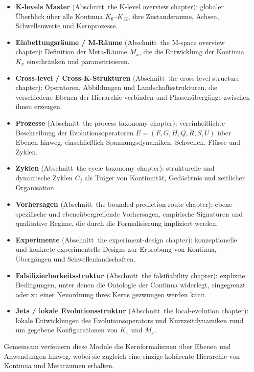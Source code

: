 \begin{itemize}
\item \textbf{K-levels Master} (Abschnitt~the K-level overview chapter):
  globaler Überblick über alle Kontinua \(K_0\)–\(K_{12}\), ihre Zustandsräume,
  Achsen, Schwellenwerte und Kernprozesse.

\item \textbf{Einbettungsräume / M-Räume} (Abschnitt~the M-space overview chapter):
  Definition der Meta-Räume \(M_x\), die die Entwicklung der Kontinua \(K_x\)
  einschränken und parametrisieren.

\item \textbf{Cross-level / Cross-K-Strukturen} (Abschnitt~the cross-level structure chapter):
  Operatoren, Abbildungen und Landschaftsstrukturen, die verschiedene Ebenen der
  Hierarchie verbinden und Phasenübergänge zwischen ihnen erzeugen.

\item \textbf{Prozesse} (Abschnitt~the process taxonomy chapter):
  vereinheitlichte Beschreibung der Evolutionsoperatoren \(E = (F,G,H,Q,R,S,U)\)
  über Ebenen hinweg, einschließlich Spannungsdynamiken, Schwellen, Flüsse und
  Zyklen.

\item \textbf{Zyklen} (Abschnitt~the cycle taxonomy chapter):
  strukturelle und dynamische Zyklen \(C_j\) als Träger von Kontinuität,
  Gedächtnis und zeitlicher Organisation.

\item \textbf{Vorhersagen} (Abschnitt~the bounded prediction-route chapter):
  ebene-spezifische und ebeneübergreifende Vorhersagen, empirische Signaturen und
  qualitative Regime, die durch die Formalisierung impliziert werden.

\item \textbf{Experimente} (Abschnitt~the experiment-design chapter):
  konzeptionelle und konkrete experimentelle Designs zur Erprobung von Kontinua,
  Übergängen und Schwellenlandschaften.

\item \textbf{Falsifizierbarkeitsstruktur} (Abschnitt~the falsifiability chapter):
  explizite Bedingungen, unter denen die Ontologie der Continua widerlegt,
  eingegrenzt oder zu einer Neuordnung ihres Kerns gezwungen werden kann.

\item \textbf{Jets / lokale Evolutionsstruktur} (Abschnitt~the local-evolution chapter):
  lokale Entwicklungen des Evolutionsoperators und Kurzzeitdynamiken rund um
  gegebene Konfigurationen von \(K_x\) und \(M_x\).
\end{itemize}

Gemeinsam verfeinern diese Module die Kernformalismen über Ebenen und Anwendungen
hinweg, wobei sie zugleich eine einzige kohärente Hierarchie von Kontinua und
Metaräumen erhalten.
